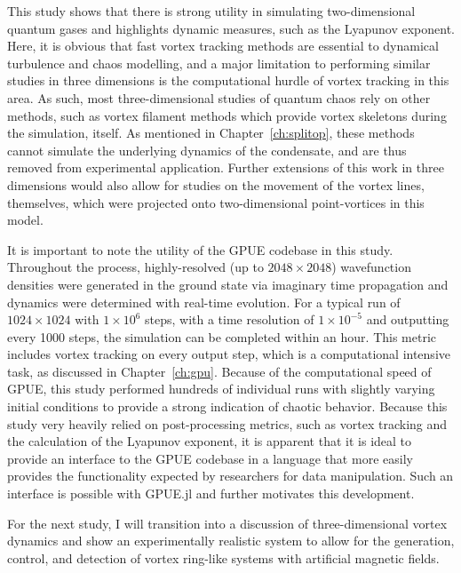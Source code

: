 This study shows that there is strong utility in simulating two-dimensional quantum gases and highlights dynamic measures, such as the Lyapunov exponent.
Here, it is obvious that fast vortex tracking methods are essential to dynamical turbulence and chaos modelling, and a major limitation to performing similar studies in three dimensions is the computational hurdle of vortex tracking in this area.
As such, most three-dimensional studies of quantum chaos rely on other methods, such as vortex filament methods which provide vortex skeletons during the simulation, itself.
As mentioned in Chapter~\ref{ch:splitop}, these methods cannot simulate the underlying dynamics of the condensate, and are thus removed from experimental application.
Further extensions of this work in three dimensions would also allow for studies on the movement of the vortex lines, themselves, which were projected onto two-dimensional point-vortices in this model.

It is important to note the utility of the GPUE codebase in this study.
Throughout the process, highly-resolved (up to $2048 \times 2048$) wavefunction densities were generated in the ground state via imaginary time propagation and dynamics were determined with real-time evolution.
For a typical run of $1024 \times 1024$ with $1\times 10^6$ steps, with a time resolution of $1\times 10^{-5}$ and outputting every 1000 steps, the simulation can be completed within an hour.
This metric includes vortex tracking on every output step, which is a computational intensive task, as discussed in Chapter~\ref{ch:gpu}.
Because of the computational speed of GPUE, this study performed hundreds of individual runs with slightly varying initial conditions to provide a strong indication of chaotic behavior.
Because this study very heavily relied on post-processing metrics, such as vortex tracking and the calculation of the Lyapunov exponent, it is apparent that it is ideal to provide an interface to the GPUE codebase in a language that more easily provides the functionality expected by researchers for data manipulation.
Such an interface is possible with GPUE.jl and further motivates this development.

For the next study, I will transition into a discussion of three-dimensional vortex dynamics and show an experimentally realistic system to allow for the generation, control, and detection of vortex ring-like systems with artificial magnetic fields.



